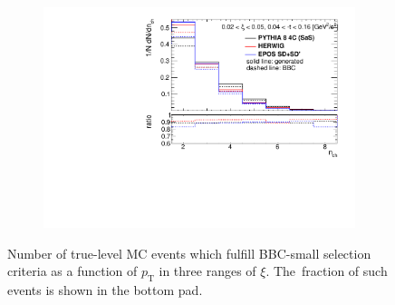 \begin{figure}[h!]
\begin{subfigure}{.45\textwidth}
		\includegraphics[width=\textwidth,page=8]{chapters/chrgSTAR/img/bbcCorrection/xi_bbc.pdf}
	\end{subfigure}
	\begin{minipage}{.45\textwidth}
		\caption{Number of true-level MC events which fulfill BBC-small selection criteria  as a function of $p_\textrm{T}$ in three ranges of $\xi$. The~fraction of such events is shown in the bottom pad.}
		\label{fig:bbcCorection_pt}
	\end{minipage}
\end{figure}

